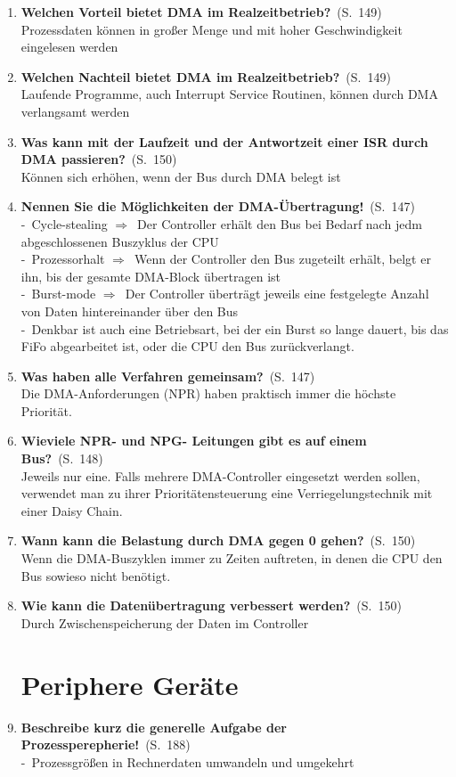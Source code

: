 \documentclass[a4paper,12pt]{article}
\newcommand{\question}[3]{\pagebreak[3]\item {\textbf{#1?}}\ (S.\ #2)#3}
\newcommand{\statement}[3]{\pagebreak[3]\item {\textbf{#1!}}\ (S.\ #2)#3}
\newcommand{\catchword}[1]{\\-\ #1}
\newcommand{\normaltext}[1]{\\#1}
\newcommand{\resultol}[1]{ $\Rightarrow$\ #1}
\newcommand{\page}[1]{#1}
\begin{document}
\begin{enumerate}
  \question{Welchen Vorteil bietet DMA im Realzeitbetrieb}{\page{149}}
  {
    \normaltext{Prozessdaten können in großer Menge und mit hoher Geschwindigkeit eingelesen werden}
  }

  \question{Welchen Nachteil bietet DMA im Realzeitbetrieb}{\page{149}}
  {
    \normaltext{Laufende Programme, auch Interrupt Service Routinen, können durch
                DMA verlangsamt werden}
  }

  \question{Was kann mit der Laufzeit und der Antwortzeit einer ISR durch DMA passieren}{\page{150}}
  {
    \normaltext{Können sich erhöhen, wenn der Bus durch DMA belegt ist}
  }

  \statement{Nennen Sie die Möglichkeiten der DMA-Übertragung}{\page{147}}
  {
    \catchword{Cycle-stealing \resultol{Der Controller erhält den Bus bei Bedarf nach jedm abgeschlossenen
    Buszyklus der CPU}}
    \catchword{Prozessorhalt \resultol{Wenn der Controller den Bus zugeteilt erhält, belgt er ihn, bis der
    gesamte DMA-Block übertragen ist}}
    \catchword{Burst-mode \resultol{Der Controller überträgt jeweils eine festgelegte Anzahl von Daten
    hintereinander über den Bus}}
    \catchword{Denkbar ist auch eine Betriebsart, bei der ein Burst so lange dauert, bis das FiFo abgearbeitet
    ist, oder die CPU den Bus zurückverlangt.}
  }
  
  \question{Was haben alle Verfahren gemeinsam}{\page{147}}
  {
    \normaltext{Die DMA-Anforderungen (NPR) haben praktisch immer die höchste Priorität.}
  }
  
  \question{Wieviele NPR- und NPG- Leitungen gibt es auf einem Bus}{\page{148}}
  {
    \normaltext{Jeweils nur eine. Falls mehrere DMA-Controller eingesetzt werden sollen, verwendet 
    man zu ihrer Prioritätensteuerung eine Verriegelungstechnik mit einer Daisy Chain.}
  }

  \question{Wann kann die Belastung durch DMA gegen 0 gehen}{\page{150}}
  {
    \normaltext{Wenn die DMA-Buszyklen immer zu Zeiten auftreten, in denen die CPU den Bus
                sowieso nicht benötigt.}
  }

  \question{Wie kann die Datenübertragung verbessert werden}{\page{150}}
  {
    \normaltext{Durch Zwischenspeicherung der Daten im Controller}
  }

  \newpage
  \section{Periphere Geräte}


  \statement{Beschreibe kurz die generelle Aufgabe der Prozessperepherie}{\page{188}}
  {
    \catchword{Prozessgrößen in Rechnerdaten umwandeln und umgekehrt}
  }


\end{enumerate}
\end{document}
